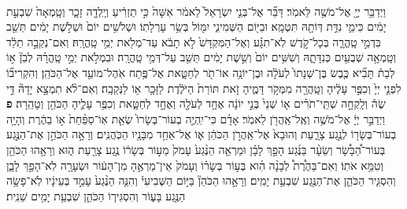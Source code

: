 \documentclass[twoside, openany, parskip=half, 11pt]{book}
\begin{document}
\begin{footnotesize}
\begin{multicols}{2}
\\
 וַיְדַבֵּ֥ר יְיָ֖ אֶל־מֹשֶׁ֥ה לֵּאמֹֽר׃ דַּבֵּ֞ר אֶל־בְּנֵ֤י יִשְׂרָאֵל֙ לֵאמֹ֔ר אִשָּׁה֙ כִּ֣י תַזְרִ֔יעַ וְיָֽלְדָ֖ה זָכָ֑ר וְטָֽמְאָה֙ שִׁבְעַ֣ת יָמִ֔ים כִּימֵ֛י נִדַּ֥ת דְּוֹתָ֖הּ תִּטְמָֽא׃ וּבַיּ֖וֹם הַשְּׁמִינִ֑י יִמּ֖וֹל בְּשַׂ֥ר עָרְלָתֽוֹ׃ וּשְׁלֹשִׁ֥ים יוֹם֙ וּשְׁלֹ֣שֶׁת יָמִ֔ים תֵּשֵׁ֖ב בִּדְמֵ֣י טָֽהֳרָ֑ה בְּכָל־קֹ֣דֶשׁ לֹֽא־תִגָּ֗ע וְאֶל־הַמִּקְדָּשׁ֙ לֹ֣א תָבֹ֔א עַד־מְלֹ֖את יְמֵ֥י טָֽהֳרָֽהּ׃  וְאִם־נְקֵבָ֣ה תֵלֵ֔ד וְטָֽמְאָ֥ה שְׁבֻעַ֖יִם כְּנִדָּתָ֑הּ וְשִׁשִּׁ֥ים יוֹם֙ וְשֵׁ֣שֶׁת יָמִ֔ים תֵּשֵׁ֖ב עַל־דְּמֵ֥י טָֽהֳרָֽה׃ וּבִמְלֹ֣את יְמֵ֣י טָֽהֳרָ֗הּ לְבֵן֘ א֣וֹ לְבַת֒ תָּבִ֞יא כֶּ֤בֶשׂ בֶּן־שְׁנָתוֹ֙ לְעֹלָ֔ה וּבֶן־יוֹנָ֥ה אוֹ־תֹ֖ר לְחַטָּ֑את אֶל־פֶּ֥תַח אֹֽהֶל־מוֹעֵ֖ד אֶל־הַכֹּהֵֽן׃ וְהִקְרִיב֞וֹ לִפְנֵ֤י יְיָ֙ וְכִפֶּ֣ר עָלֶ֔יהָ וְטָֽהֲרָ֖ה מִמְּקֹ֣ר דָּמֶ֑יהָ זֹ֤את תּוֹרַת֙ הַיֹּלֶ֔דֶת לַזָּכָ֖ר א֥וֹ לַנְּקֵבָֽה׃ וְאִם־לֹ֨א תִמְצָ֣א יָדָהּ֘ דֵּ֣י שֶׂה֒ וְלָֽקְחָ֣ה שְׁתֵּֽי־תֹרִ֗ים א֤וֹ שְׁנֵי֙ בְּנֵ֣י יוֹנָ֔ה אֶחָ֥ד לְעֹלָ֖ה וְאֶחָ֣ד לְחַטָּ֑את וְכִפֶּ֥ר עָלֶ֛יהָ הַכֹּהֵ֖ן וְטָהֵֽרָה׃ \textbf{פ} 
 וַיְדַבֵּ֣ר יְיָ֔ אֶל־מֹשֶׁ֥ה וְאֶֽל־אַֽהֲרֹ֖ן לֵאמֹֽר׃ אָדָ֗ם כִּי־יִֽהְיֶ֤ה בְעוֹר־בְּשָׂרוֹ֙ שְׂאֵ֤ת אֽוֹ־סַפַּ֨חַת֙ א֣וֹ בַהֶ֔רֶת וְהָיָ֥ה בְעוֹר־בְּשָׂר֖וֹ לְנֶ֣גַע צָרָ֑עַת וְהוּבָא֙ אֶל־אַֽהֲרֹ֣ן הַכֹּהֵ֔ן א֛וֹ אֶל־אַחַ֥ד מִבָּנָ֖יו הַכֹּֽהֲנִֽים׃ וְרָאָ֣ה הַכֹּהֵ֣ן אֶת־הַנֶּ֣גַע בְּעוֹר־הַ֠בָּשָׂ֠ר וְשֵׂעָ֨ר בַּנֶּ֜גַע הָפַ֣ךְ לָבָ֗ן וּמַרְאֵ֤ה הַנֶּ֨גַע֙ עָמֹק֙ מֵע֣וֹר בְּשָׂר֔וֹ נֶ֥גַע צָרַ֖עַת ה֑וּא וְרָאָ֥הוּ הַכֹּהֵ֖ן וְטִמֵּ֥א אֹתֽוֹ׃ וְאִם־בַּהֶ֩רֶת֩ לְבָנָ֨ה הִ֜וא בְּע֣וֹר בְּשָׂר֗וֹ וְעָמֹק֙ אֵין־מַרְאֶ֣הָ מִן־הָע֔וֹר וּשְׂעָרָ֖ה לֹֽא־הָפַ֣ךְ לָבָ֑ן וְהִסְגִּ֧יר הַכֹּהֵ֛ן אֶת־הַנֶּ֖גַע שִׁבְעַ֥ת יָמִֽים׃ וְרָאָ֣הוּ הַכֹּהֵן֘ בַּיּ֣וֹם הַשְּׁבִיעִי֒ וְהִנֵּ֤ה הַנֶּ֨גַע֙ עָמַ֣ד בְּעֵינָ֔יו לֹֽא־פָשָׂ֥ה הַנֶּ֖גַע בָּע֑וֹר וְהִסְגִּיר֧וֹ הַכֹּהֵ֛ן שִׁבְעַ֥ת יָמִ֖ים שֵׁנִֽית׃


\end{multicols}
\end{footnotesize}
\end{document}
